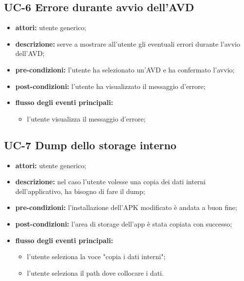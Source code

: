 \subsection*{UC-6 Errore durante avvio dell'AVD}\label{subsec:uc-6-errore-durante-avvio-dell'avd}
\begin{itemize}
    \item \textbf{attori:} utente generico;
    \item \textbf{descrizione:} serve a mostrare all'utente gli eventuali errori durante l'avvio dell'AVD;
    \item \textbf{pre-condizioni:} l'utente ha selezionato un'AVD e ha confermato l'avvio;
    \item \textbf{post-condizioni:} l'utente ha visualizzato il messaggio d'errore;
    \item \textbf{flusso degli eventi principali:}
    \begin{itemize}
        \item l'utente visualizza il messaggio d'errore;
    \end{itemize}
\end{itemize}
\subsection*{UC-7 Dump dello storage interno}\label{subsec:uc-6-dump-dello-storage-interno}
\begin{itemize}
    \item \textbf{attori:} utente generico;
    \item \textbf{descrizione:} nel caso l'utente volesse una copia dei dati interni dell'applicativo, ha bisogno di fare il dump;
    \item \textbf{pre-condizioni:} l'installazione dell'APK modificato è andata a buon fine;
    \item \textbf{post-condizioni:} l'area di storage dell'app è stata copiata con successo;
    \item \textbf{flusso degli eventi principali:}
    \begin{itemize}
        \item l'utente seleziona la voce "copia i dati interni";
        \item l'utente seleziona il path dove collocare i dati.
    \end{itemize}
\end{itemize}

